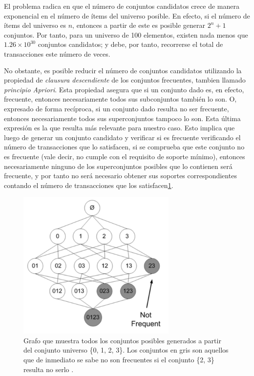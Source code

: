 El problema radica en que el número de conjuntos candidatos crece de manera exponencial en el número de ítems del universo posible. En efecto, si el número de ítems del universo es $n$, entonces a partir de este es posible generar $2^n+1$ conjuntos. Por tanto, para un universo de 100 elementos, existen nada menos que $1.26\times10^{30}$ conjuntos candidatos; y debe, por tanto, recorrerse el total de transacciones este número de veces.

No obstante, es posible reducir el número de conjuntos candidatos utilizando la propiedad de \textit{clausura descendiente} de los conjuntos frecuentes, tambien llamado \textit{principio Apriori}. Esta propiedad asegura que si un conjunto dado es, en efecto, frecuente, entonces necesariamente todos sus subconjuntos también lo son. O, expresado de forma recíproca, si un conjunto dado resulta no ser frecuente, entonces necesariamente todos sus superconjuntos tampoco lo son. Esta última expresión es la que resulta más relevante para nuestro caso. Esto implica que luego de generar un conjunto candidato y verificar si es frecuente verificando el número de transacciones que lo satisfacen, si se comprueba que este conjunto no es frecuente (vale decir, no cumple con el requisito de soporte mínimo), entonces necesariamente ninguno de los superconjuntos posibles que lo contienen será frecuente, y por tanto no será necesario obtener sus soportes correspondientes contando el número de transacciones que los satisfacen\ref{fig:unfrequent_itemsets}.

\begin{figure}[h!]
\begin{center}
\includegraphics[width=0.7\textwidth]{imagenes/unfrequent_itemsets.png}
\end{center}
\vspace*{-5mm}
\caption{Grafo que muestra todos los conjuntos posibles generados a partir del conjunto universo \{0, 1, 2, 3\}. Los conjuntos en gris son aquellos que de inmediato se sabe no son frecuentes si el conjunto \{2, 3\} resulta no serlo \cite{harrington2012machine}.}
\label{fig:unfrequent_itemsets}
\end{figure}

